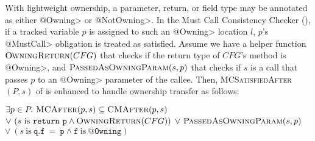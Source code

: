 With lightweight ownership, a parameter, return, or field type may be annotated
as either \<@Owning> or \<@NotOwning>.
In the Must Call Consistency Checker
(), if a tracked variable $p$ is assigned to such an
\<@Owning> location $l$, $p$'s
\<@MustCall> obligation is treated as satisfied. Assume we have a helper
function $\textsc{OwningReturn}(CFG)$ that checks if the return type of $CFG$'s
method is \<@Owning>, and $\textsc{PassedAsOwningParam}(s,p)$ that checks if $s$ is a
call that passes $p$ to an \<@Owning> parameter of the callee.  Then,
\textsc{MCSatisfiedAfter}$(P,s)$ of  is enhanced to handle
ownership transfer as follows:

\begin{algorithmic}
  \State \Return $\exists p \in P .\ \textsc{MCAfter}(p,s) \subseteq \textsc{CMAfter}(p,s)$ \newline
  \hspace*{6em} $\vee\ (s \mathrm{\ is\ } \mathtt{return\ p} \wedge \textsc{OwningReturn}(CFG))$ \newline
  \hspace*{6em} $\vee\ \textsc{PassedAsOwningParam}(s,p)$\newline
  \hspace*{6em} $\vee\ (s \mathrm{\ is\ } \mathtt{q.f\ =\ p} \wedge \mathtt{f} \mathrm{\ is\ } \mathtt{@Owning})$
  \EndProcedure

\end{algorithmic}

